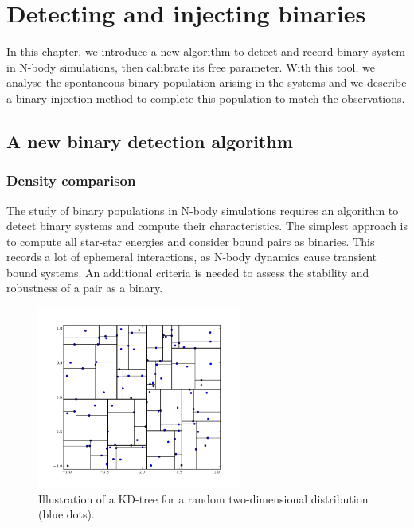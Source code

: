 
\chapter{Detecting and injecting binaries}
\label{Chap:BinAlgo}

In this chapter, we introduce a new algorithm to detect and record binary system in N-body simulations, then calibrate its free parameter. With this tool, we analyse the spontaneous binary population arising in the \HubLem systems and we describe a binary injection method to complete this population to match the observations.


\minitoc

\section{A new binary detection algorithm}


\subsection{Density comparison}

The study of binary populations in N-body simulations requires an algorithm to detect binary systems and compute their characteristics. The simplest approach is to compute all star-star energies and consider bound pairs as binaries. This records a lot of ephemeral interactions, as N-body dynamics cause transient bound systems. An additional criteria is needed to assess the stability and robustness of a pair as a binary.

\begin{figure}
\begin{center}
\includegraphics[width=0.6\textwidth]{Figures/5_kdtree}
\caption[Illustration of a KD-tree]{Illustration of a KD-tree for a random two-dimensional distribution (blue dots).}
\label{Fig:5_kdtree}
\end{center}
\end{figure}


